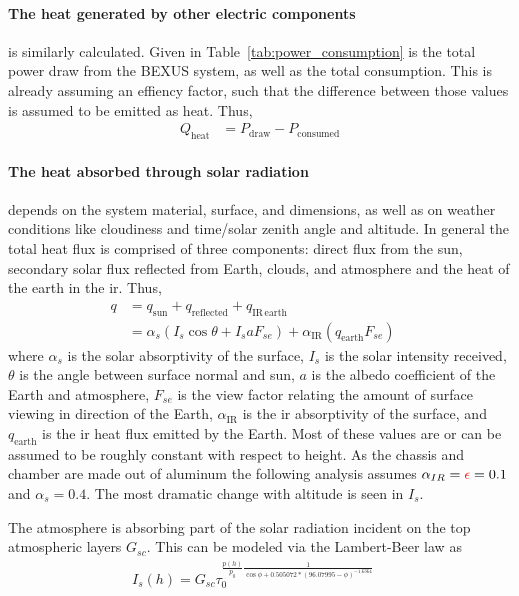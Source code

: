 \documentclass[
  a4paper,
  11pt,
  openany,
  parskip,
  toc=totoc,
  listof=totoc,
  bibliography=totoc
]{scrreprt}
\newcommand{\tref}[1]{Table~\ref{#1}}
\newcommand{\dos}{\textcolor{red}}
\newcommand{\qc}{\quad}
\begin{document}
\paragraph{The heat generated by other electric components} is similarly calculated. Given in \tref{tab:power_consumption} is the total power draw from the BEXUS system, as well as the total consumption. This is already assuming an effiency factor, such that the difference between those values is assumed to be emitted as heat. Thus,
\begin{align}
     Q_\mathrm{heat} &= P_\mathrm{draw}- P_\mathrm{consumed}   
\end{align}

\paragraph{The heat absorbed through solar radiation} depends on the system material, surface, and dimensions, as well as on weather conditions like cloudiness and time/solar zenith angle and altitude. In general the total heat flux is comprised of three components: direct flux from the sun, secondary solar flux reflected from Earth, clouds, and atmosphere and the heat of the earth in the \gls{ir}. Thus,
\begin{align}
    q &= q_\mathrm{sun}+q_\mathrm{reflected}+q_\mathrm{IR\,earth}\\
    &=\alpha_s (I_s \cos{\theta}+ I_s a F_{se} ) + \alpha_\mathrm{IR}(q_\mathrm{earth} F_{se})\qc
\end{align}
where $\alpha_s$ is the solar absorptivity of the surface, $I_s$ is the solar intensity received, $\theta$ is the angle between surface normal and sun, $a$ is the albedo coefficient of the Earth and atmosphere, $F_{se}$ is the view factor relating the amount of surface viewing in direction of the Earth, $\alpha_\mathrm{IR}$ is the \gls{ir} absorptivity of the surface, and $q_\mathrm{earth}$ is the \gls{ir} heat flux emitted by the Earth. Most of these values are or can be assumed to be roughly constant with respect to height. As the chassis and chamber are made out of aluminum the following analysis assumes $\alpha_{IR}=\dos{\epsilon}=0.1$ and $\alpha_s=0.4$.
The most dramatic change with altitude is seen in $I_s$.\par 
The atmosphere is absorbing part of the solar radiation incident on the top atmospheric layers $G_{sc}$. This can be modeled via the Lambert-Beer law as 
\begin{align}
    I_s(h) = G_{sc}\tau_0^{\frac{p(h)}{p_0}\frac{1}{\cos{\phi}+  0.505072 * (96.07995 - \phi) ^ {-1.6364}
}}\qc
\end{align}
\end{document}
